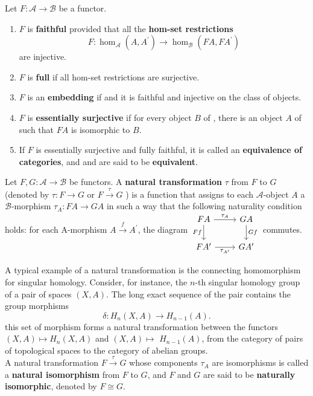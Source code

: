 \noindent Let $F: \mathcal{A} \rightarrow \mathcal{B}$ be a functor.
\begin{enumerate}
    \item $F$ is \textbf{faithful} provided that all the \textbf{hom-set restrictions}
    $$
    F: \operatorname{hom}_{\mathcal{A}}\left(A, A^{\prime}\right) \rightarrow \operatorname{hom}_{\mathcal{B}}\left(F A, F A^{\prime}\right)
    $$
    are injective.
    \item $F$ is \textbf{full} if all hom-set restrictions are surjective.
    \item $F$ is an \textbf{embedding} if and it is faithful and injective on the class of objects.
    \item $F$ is \textbf{essentially surjective} if for every object $B$ of \cb, there is an object $A$ of \ca such that $F A$ is isomorphic to $B$. 
    \item If $F$ is essentially surjective and fully faithful, it is called an \textbf{equivalence of categories}, and \ca and \cb are said to be \textbf{equivalent}.
\end{enumerate}

Let $F, G: \mathcal{A} \rightarrow \mathcal{B}$ be functors. A \textbf{natural transformation} $\tau$ from $F$ to $G$ (denoted by $\tau: F \rightarrow G$ or $F \xrightarrow{\tau} G$ ) is a function that assigns to each $\mathcal{A}$-object $A$ a $\mathcal{B}$-morphism $\tau_A: F A \rightarrow G A$ in such a way that the following naturality condition holds: for each A-morphism $A \xrightarrow{f} A^{\prime}$, the diagram
$
\begin{tikzcd}
FA \arrow[r, "\tau_A"] \arrow[d, "Ff"'] & GA \arrow[d, "Gf"] \\
FA' \arrow[r, "\tau_{A'}"'] & GA'
\end{tikzcd}
$ commutes.\\

\begin{example}
    A typical example of a natural transformation is the connecting homomorphism for singular homology. Consider, for instance, the $n$-th singular homology group of a pair of spaces $(X, A)$. The long exact sequence of the pair contains the group morphisms
$$
\delta: H_n(X, A) \rightarrow H_{n-1}(A) .
$$
\noindent
this set of morphism forms a natural transformation between the functors  $(X, A) \mapsto H_n(X, A)$ and $(X, A) \mapsto$ $H_{n-1}(A)$, from the category of pairs of topological spaces to the category of abelian groups. \\



A natural transformation $F \xrightarrow{\tau} G$ whose components $\tau_A$ are isomorphisms is called a \textbf{natural isomorphism} from $F$ to $G$, and $F$ and $G$ are said to be \textbf{naturally isomorphic}, denoted by $F \cong G$.\\
\end{example}


